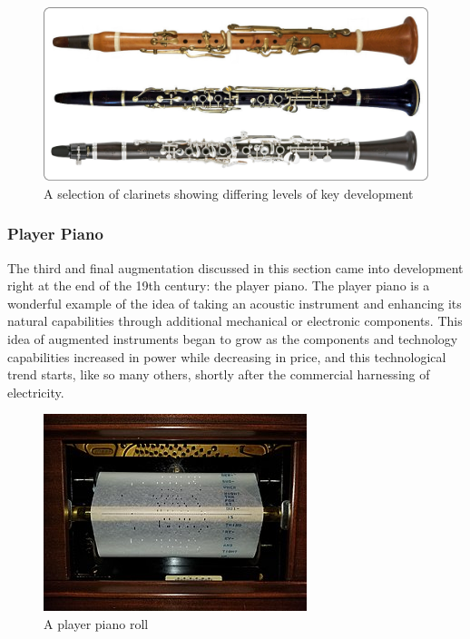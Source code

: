 \begin{figure}
    \centering
    \includegraphics[scale=0.07]{diagrams/M-A-O-clarinets.jpg}
    \caption{A selection of clarinets showing differing levels of key development}
    \label{fig:clKeys} %
\end{figure}

\subsubsection{Player Piano}

The third and final augmentation discussed in this section came into development right at the end of the 19th century: the player piano. The player piano is a wonderful example of the idea of taking an acoustic instrument and enhancing its natural capabilities through additional mechanical or electronic components. This idea of augmented instruments began to grow as the components and technology capabilities increased in power while decreasing in price, and this technological trend starts, like so many others, shortly after the commercial harnessing of electricity.

\begin{figure}
    \centering
    \includegraphics[scale=0.8]{diagrams/PlayerPianoRoll.jpg}
    \caption{A player piano roll}
    \label{fig:pianoroll}
\end{figure}

